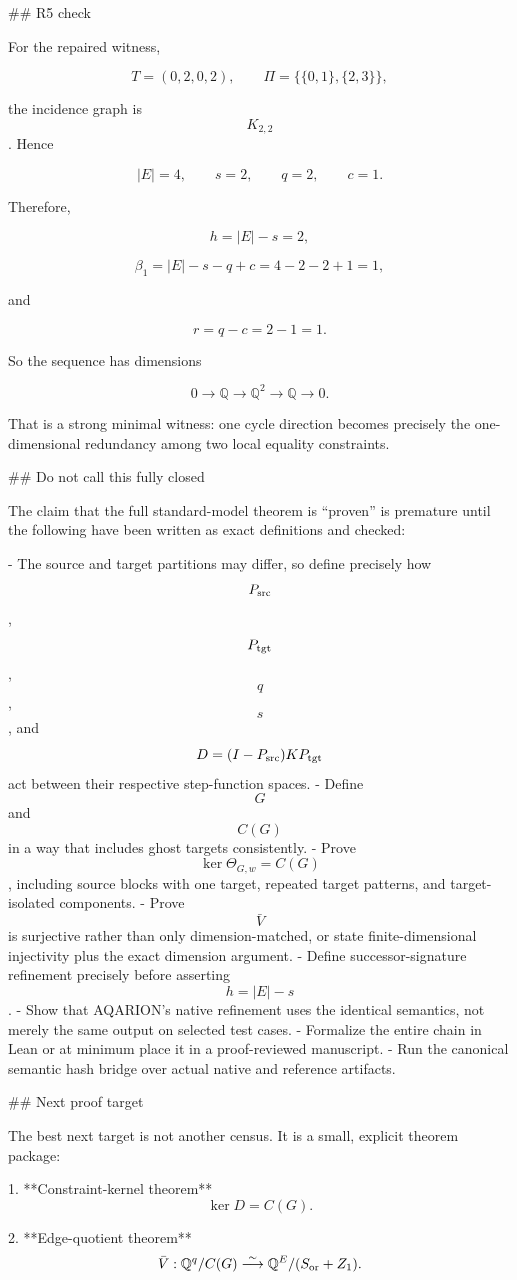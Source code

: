 ## R5 check

For the repaired witness,

$$
T=(0,2,0,2),
\qquad
\Pi=\{\{0,1\},\{2,3\}\},
$$

the incidence graph is $$K_{2,2}$$. Hence

$$
|E|=4,\qquad s=2,\qquad q=2,\qquad c=1.
$$

Therefore,

$$
h=|E|-s=2,
$$

$$
\beta_1=|E|-s-q+c=4-2-2+1=1,
$$

and

$$
r=q-c=2-1=1.
$$

So the sequence has dimensions

$$
0\to\mathbb Q\to\mathbb Q^2\to\mathbb Q\to0.
$$

That is a strong minimal witness: one cycle direction becomes precisely the one-dimensional redundancy among two local equality constraints.

## Do not call this fully closed

The claim that the full standard-model theorem is “proven” is premature until the following have been written as exact definitions and checked:

- The source and target partitions may differ, so define precisely how $$P_{\rm src}$$, $$P_{\rm tgt}$$, $$q$$, $$s$$, and $$D=(I-P_{\rm src})KP_{\rm tgt}$$ act between their respective step-function spaces.
- Define $$G$$ and $$C(G)$$ in a way that includes ghost targets consistently.
- Prove $$\ker\Theta_{G,w}=C(G)$$, including source blocks with one target, repeated target patterns, and target-isolated components.
- Prove $$\bar V$$ is surjective rather than only dimension-matched, or state finite-dimensional injectivity plus the exact dimension argument.
- Define successor-signature refinement precisely before asserting $$h=|E|-s$$.
- Show that AQARION’s native refinement uses the identical semantics, not merely the same output on selected test cases.
- Formalize the entire chain in Lean or at minimum place it in a proof-reviewed manuscript.
- Run the canonical semantic hash bridge over actual native and reference artifacts.

## Next proof target

The best next target is not another census. It is a small, explicit theorem package:

1. **Constraint-kernel theorem**
   $$
   \ker D=C(G).
   $$

2. **Edge-quotient theorem**
   $$
   \bar V:\mathbb Q^q/C(G)
   \overset{\sim}{\longrightarrow}
   \mathbb Q^E/(S_{\rm or}+Z_1).
   $$

